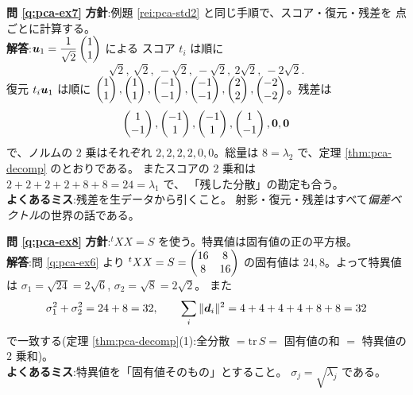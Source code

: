 \bigskip
\noindent\textbf{問 \ref{q:pca-ex7}}\quad
\textbf{方針}:例題 \ref{rei:pca-std2} と同じ手順で、スコア・復元・残差を
点ごとに計算する。\\
\textbf{解答}:$\bm{u}_1 = \dfrac{1}{\sqrt{2}}\begin{pmatrix}1 \\ 1\end{pmatrix}$ による
スコア $t_i$ は順に
\[
\sqrt{2},\ \sqrt{2},\ -\sqrt{2},\ -\sqrt{2},\ 2\sqrt{2},\ -2\sqrt{2}.
\]
復元 $t_i\bm{u}_1$ は順に
$\begin{pmatrix}1 \\ 1\end{pmatrix}, \begin{pmatrix}1 \\ 1\end{pmatrix}, \begin{pmatrix}-1 \\ -1\end{pmatrix}, \begin{pmatrix}-1 \\ -1\end{pmatrix},
\begin{pmatrix}2 \\ 2\end{pmatrix}, \begin{pmatrix}-2 \\ -2\end{pmatrix}$。残差は
\[
\begin{pmatrix}1 \\ -1\end{pmatrix}, \begin{pmatrix}-1 \\ 1\end{pmatrix}, \begin{pmatrix}-1 \\ 1\end{pmatrix}, \begin{pmatrix}1 \\ -1\end{pmatrix},
\bm{0}, \bm{0}
\]
で、ノルムの $2$ 乗はそれぞれ $2, 2, 2, 2, 0, 0$。総量は
$8 = \lambda_2$ で、定理 \ref{thm:pca-decomp} のとおりである。
またスコアの $2$ 乗和は $2 + 2 + 2 + 2 + 8 + 8 = 24 = \lambda_1$ で、
「残した分散」の勘定も合う。\\
\textbf{よくあるミス}:残差を生データから引くこと。
射影・復元・残差はすべて\emph{偏差ベクトル}の世界の話である。

\bigskip
\noindent\textbf{問 \ref{q:pca-ex8}}\quad
\textbf{方針}:${}^tXX = S$ を使う。特異値は固有値の正の平方根。\\
\textbf{解答}:問 \ref{q:pca-ex6} より ${}^tXX = S = \begin{pmatrix}16 & 8 \\ 8 & 16\end{pmatrix}$
の固有値は $24, 8$。よって特異値は
$\sigma_1 = \sqrt{24} = 2\sqrt{6}$, $\sigma_2 = \sqrt{8} = 2\sqrt{2}$。
また
\[
\sigma_1^2 + \sigma_2^2 = 24 + 8 = 32, \qquad
\sum_i \|\bm{d}_i\|^2 = 4 + 4 + 4 + 4 + 8 + 8 = 32
\]
で一致する(定理 \ref{thm:pca-decomp}(1):全分散
$= \mathrm{tr}\,S = $ 固有値の和 $=$ 特異値の $2$ 乗和)。\\
\textbf{よくあるミス}:特異値を「固有値そのもの」とすること。
$\sigma_j = \sqrt{\lambda_j}$ である。

